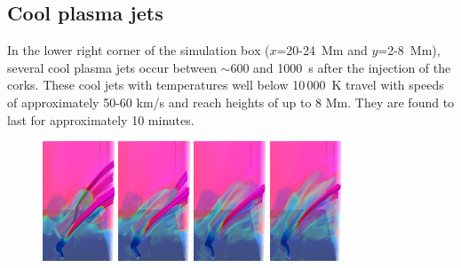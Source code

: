 \documentclass{aa}
\begin{document}
{\subsection{Cool plasma jets}\label{section_cool_plasma}
In the lower right corner of the simulation box ($x$=20-24~Mm and $y$=2-8~Mm), several cool plasma jets occur between $\sim$600 and 1000~s after the injection of the corks. These cool jets with temperatures well below 10\,000~K travel with speeds of approximately 50-60 km/s and reach heights of up to 8 Mm. They are found to last for approximately 10 minutes.

\begin{figure}[!h]
\sidecaption
\begin{minipage}{12cm}
\vspace{-1.5cm}
\includegraphics[width=0.19\textwidth]{figures2/subset_logT_66.pdf}
\includegraphics[width=0.19\textwidth]{figures2/subset_logT_68.pdf}
\includegraphics[width=0.19\textwidth]{figures2/subset_logT_70.pdf}
\includegraphics[width=0.19\textwidth]{figures2/subset_logT_72.pdf}

\end{minipage}
\end{figure}}
\end{document}
